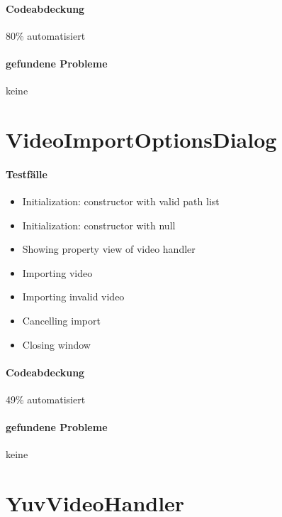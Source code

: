\paragraph*{Codeabdeckung}
80\% automatisiert

\paragraph*{gefundene Probleme}
keine

\section{VideoImportOptionsDialog}
\paragraph*{Testfälle}
\begin{itemize}
\item Initialization: constructor with valid path list
\item Initialization: constructor with null
\item Showing property view of video handler
\item Importing video
\item Importing invalid video
\item Cancelling import
\item Closing window
\end{itemize}

\paragraph*{Codeabdeckung}
49\% automatisiert

\paragraph*{gefundene Probleme}
keine

\section{YuvVideoHandler}
